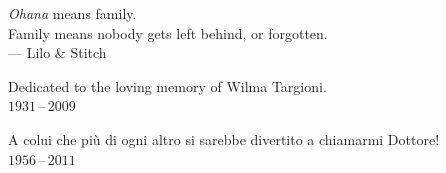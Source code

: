 \thispagestyle{empty}
{}

\vspace*{3cm}

\begin{center}
    \emph{Ohana} means family. \\
    Family means nobody gets left behind, or forgotten. \\ \medskip
    --- Lilo \& Stitch    
\end{center}

\medskip

\begin{center}
    Dedicated to the loving memory of Wilma Targioni. \\ \smallskip
    $1931$\,--\,$2009$
\end{center}

\begin{center}
    A colui che pi\`u di ogni altro si sarebbe divertito a chiamarmi \flqq Dottore! \frqq \\ \smallskip
    $1956$\,--\,$2011$
\end{center}
